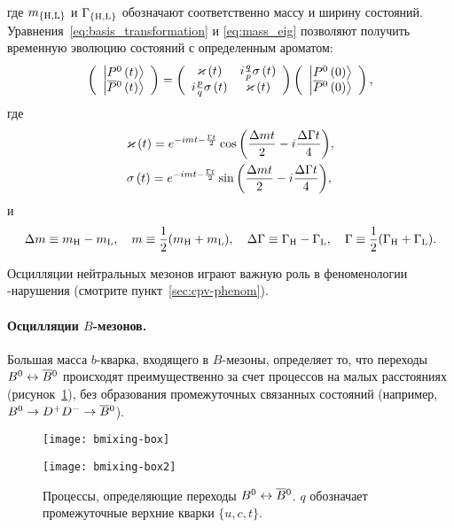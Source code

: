 где $m_{\{\mathrm{H},\mathrm{L}\}}$ и $\Gamma_{\{\mathrm{H},\mathrm{L}\}}$ обозначают соответственно массу и ширину состояний.  Уравнения~\eqref{eq:basis_transformation} и \eqref{eq:mass_eig} позволяют получить временную эволюцию состояний с определенным ароматом:
\begin{equation}\label{eq:flavor_states_evolution}
 \left (\begin{array}{c}\left|P^0\left(t\right)\right>\\\left|\overline{P}{}^0\left(t\right)\right>\end{array}\right )=
 \left (\begin{array}{cc}\varkappa\left(t\right) & i\frac{q}{p}\sigma\left(t\right)\\
 i\frac{p}{q}\sigma\left(t\right) & \varkappa\left(t\right) \end{array}\right )
 \left (\begin{array}{c}\left|P^0\left(0\right)\right>\\\left|\overline{P}{}^0\left(0\right)\right>\end{array}\right ),
 \end{equation}
где
\begin{equation}\label{eq:kap_sig}
 \begin{split}
 &\kapp = \emg\cos{\left(\frac{\dm t}{2}-i\frac{\dg t}{4}\right)},\\
 &\sigm = \emg\sin{\left(\frac{\dm t}{2}-i\frac{\dg t}{4}\right)},
 \end{split}
\end{equation}
и
\begin{equation}
 \Delta m \equiv m_{\mathrm{H}} - m_{\mathrm{L}},\quad 
   m \equiv \frac{1}{2}(m_{\mathrm{H}}+m_{\mathrm{L}}),\quad
 \Delta\Gamma \equiv \Gamma_{\mathrm{H}} - \Gamma_{\mathrm{L}},\quad
   \Gamma \equiv \frac{1}{2}(\Gamma_{\mathrm{H}}+\Gamma_{\mathrm{L}}).
\end{equation}

Осцилляции нейтральных мезонов играют важную роль в феноменологии \cpconj-нарушения (смотрите пункт~\ref{sec:cpv-phenom}).

\paragraph{\boldmath Осцилляции $B$-мезонов. }
Большая масса $b$-кварка, входящего в $B$-мезоны, определяет то, что переходы $B^0\leftrightarrow\overline{B}{}^0$ происходят преимущественно за счет процессов на малых расстояниях (рисунок~\ref{fig:box-mixing}), без образования промежуточных связанных состояний (например, $B^0\to D^+D^-\to\overline{B}{}^0$).  

\begin{figure}[htb]
   \centering
    \begin{minipage}[b]{0.49\textwidth}
  \centering
  \texttt{[image: bmixing-box]}
  \subcaption{}
 \end{minipage}
 \begin{minipage}[b]{0.49\textwidth}
  \centering
  \texttt{[image: bmixing-box2]}
  \subcaption{}
 \end{minipage}
   \caption{Процессы, определяющие переходы $B^0\leftrightarrow\overline{B}{}^0$. $q$ обозначает промежуточные верхние кварки $\{u, c, t\}$.}
 \label{fig:box-mixing}
\end{figure}

